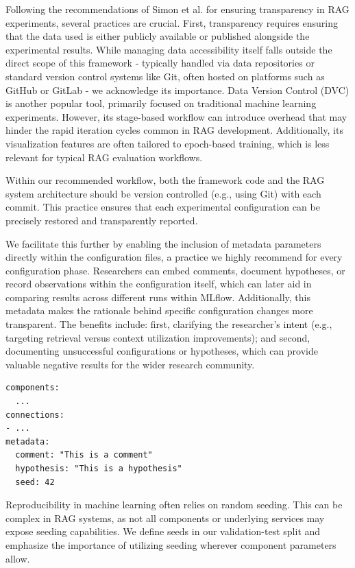 Following the recommendations of Simon et al. \cite{Simon.10112024} for ensuring transparency in RAG experiments, several practices are crucial. First, transparency requires ensuring that the data used is either publicly available or published alongside the experimental results. While managing data accessibility itself falls outside the direct scope of this framework - typically handled via data repositories or standard version control systems like Git, often hosted on platforms such as GitHub \cite{github-inc-2025} or GitLab \cite{gitlab-inc-2025} - we acknowledge its importance. Data Version Control (DVC) \cite{dvc.17.03.2025} is another popular tool, primarily focused on traditional machine learning experiments. However, its stage-based workflow can introduce overhead that may hinder the rapid iteration cycles common in RAG development. Additionally, its visualization features are often tailored to epoch-based training, which is less relevant for typical RAG evaluation workflows.

Within our recommended workflow, both the framework code and the RAG system architecture should be version controlled (e.g., using Git) with each commit. This practice ensures that each experimental configuration can be precisely restored and transparently reported.

We facilitate this further by enabling the inclusion of metadata parameters directly within the configuration files, a practice we highly recommend for every configuration phase. Researchers can embed comments, document hypotheses, or record observations within the configuration itself, which can later aid in comparing results across different runs within MLflow. Additionally, this metadata makes the rationale behind specific configuration changes more transparent. The benefits include: first, clarifying the researcher's intent (e.g., targeting retrieval versus context utilization improvements); and second, documenting unsuccessful configurations or hypotheses, which can provide valuable negative results for the wider research community.

\begin{verbatim}
components:
  ...
connections:
- ...
metadata: 
  comment: "This is a comment"
  hypothesis: "This is a hypothesis"
  seed: 42
\end{verbatim}

Reproducibility in machine learning often relies on random seeding. This can be complex in RAG systems, as not all components or underlying services may expose seeding capabilities. We define seeds in our validation-test split and emphasize the importance of utilizing seeding wherever component parameters allow.

